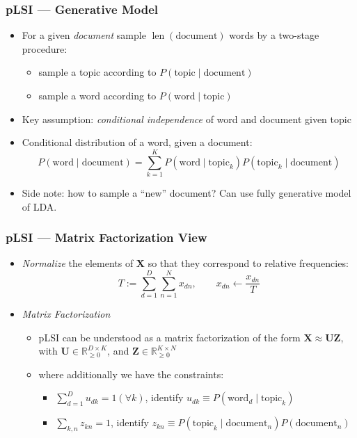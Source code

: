 \documentclass[11pt,a4paper,technote]{IEEEtran}
\newcommand{\matr}[1]{\boldsymbol{\mathbf{#1}}}
\DeclareMathOperator{\len}{len}
\newcommand{\R}{\mathbb{R}}
\begin{document}
\subsubsection*{pLSI --- Generative Model}
\begin{itemize}
  \item For a given \emph{document} sample \emph{$\len(\mathrm{document})$}
    words by a two-stage procedure:
    \begin{itemize}
      \item sample a topic according to $P(\mathrm{topic}\mid\mathrm{document})$
      \item sample a word according to $P(\mathrm{word}\mid\mathrm{topic})$
    \end{itemize}
  \item Key assumption: \emph{conditional independence} of word and document
    given topic
  \item Conditional distribution of a word, given a document:
    \[
      P(\mathrm{word}\mid\mathrm{document}) = \sum_{k=1}^K P(\mathrm{word}\mid
      \mathrm{topic}_k) P(\mathrm{topic}_k \mid \mathrm{document})
    \]
  \item Side note: how to sample a ``new'' document? Can use fully generative
    model of LDA.\@
\end{itemize}

\subsubsection*{pLSI --- Matrix Factorization View}
\begin{itemize}
  \item \emph{Normalize} the elements of $\matr{X}$ so that they correspond to
    relative frequencies:
    \[
      T := \sum_{d=1}^D \sum_{n=1}^N x_{dn}, \qquad x_{dn}\gets\frac{x_{dn}}{T}
    \]
  \item \emph{Matrix Factorization}
    \begin{itemize}
      \item pLSI can be understood as a matrix factorization of the form
        $\matr{X}\approx\matr{U}\matr{Z}$, with $\matr{U}\in\R_{\geq 0}^{D
          \times K}$, and $\matr{Z}\in\R_{\geq 0}^{K \times N}$
      \item where additionally we have the constraints:
        \begin{itemize}
          \item $\sum_{d=1}^D u_{dk} = 1 (\forall k)$, identify $u_{dk} \equiv
            P(\mathrm{word}_d \mid \mathrm{topic}_k)$
          \item $\sum_{k,n} z_{kn} = 1$, identify $z_{kn} \equiv
            P(\mathrm{topic}_k \mid \mathrm{document}_n) P(\mathrm{document}_n)$
        \end{itemize}
    \end{itemize}
\end{itemize}
\end{document}
